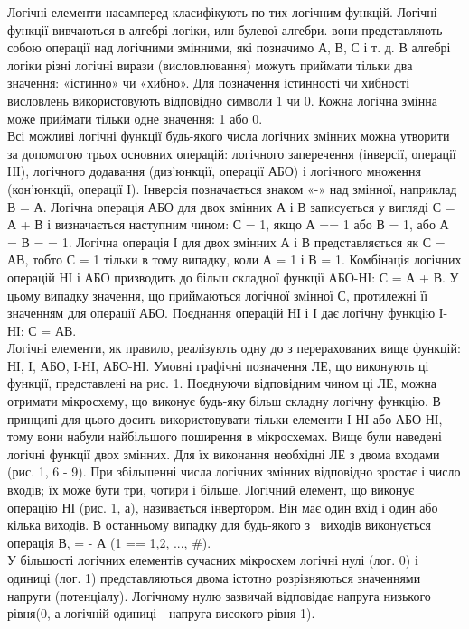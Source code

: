 \documentclass[a4paper,14pt]{extreport}
\begin{document}
  Логічні елементи насамперед класифікують по тих логічним функцій. Логічні функції
  вивчаються в алгебрі логіки, илн булевої алгебри. вони представляють
  собою операції над логічними змінними, які позначимо А, В, С і т. д. В алгебрі логіки різні логічні вирази (висловлювання) можуть приймати тільки два значення: «істинно» чи «хибно». Для позначення істинності чи хибності висловлень використовують відповідно символи 1 чи 0. Кожна логічна змінна може приймати тільки одне значення: 1 або 0.\\

  Всі можливі логічні функції будь-якого числа логічних
  змінних можна утворити за допомогою трьох основних операцій: логічного заперечення (інверсії, операції НІ), логічного додавання (диз'юнкції, операції АБО) і логічного множення (кон'юнкції, операції І). Інверсія позначається знаком «-» над змінної, наприклад В = А. Логічна операція АБО для двох змінних А і В записується у вигляді С = А + В і визначається наступним чином: С = 1, якщо А == 1 або В = 1, або А = В =
  = 1. Логічна операція І для двох змінних А і В представляється як С = АВ, тобто С = 1 тільки в тому випадку, коли А = 1 і
  В = 1. Комбінація логічних операцій НІ і АБО призводить до більш складної функції АБО-НІ: С = А + В. У цьому випадку значення, що приймаються логічної змінної С, протилежні її значенням для операції АБО. Поєднання операцій НІ і І дає логічну функцію І-НІ: С = АВ.\\

  Логічні елементи, як правило, реалізують одну до з перерахованих вище функцій: НІ, І, АБО, І-НІ, АБО-НІ.
  Умовні графічні позначення ЛЕ, що виконують ці функції, представлені на рис. 1. Поєднуючи відповідним чином ці ЛЕ, можна отримати мікросхему, що виконує будь-яку більш складну логічну функцію. В принципі для цього досить використовувати тільки елементи І-НІ або АБО-НІ, тому вони набули найбільшого поширення в мікросхемах. Вище були наведені логічні функції двох змінних. Для їх виконання необхідні ЛЕ з двома входами (рис. 1, 6 - 9). При збільшенні числа логічних змінних відповідно зростає і число входів; їх може бути три, чотири і більше. Логічний елемент, що виконує
  операцію НІ (рис. 1, а), називається інвертором. Він має один вхід і один або кілька виходів. В останньому випадку для будь-якого з \ виходів виконується операція В, = - А (1 == 1,2, ..., \#).\\

  У більшості логічних елементів сучасних мікросхем логічні нулі (лог. 0) і одиниці (лог. 1) представляються двома істотно розрізняються значеннями напруги (потенціалу). Логічному нулю зазвичай відповідає напруга низького рівня(0, а логічній одиниці - напруга високого рівня 1).\\
\end{document}
